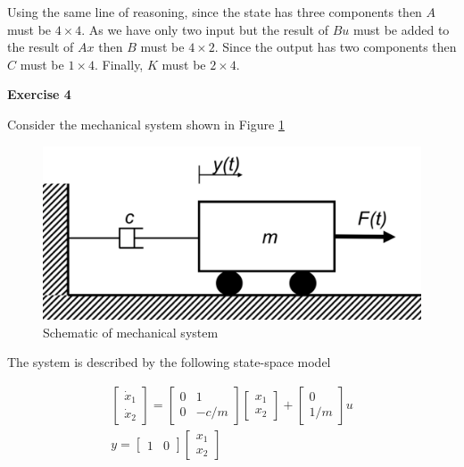Using the same line of reasoning, since the state has three components then $A$ must be $4\times 4$. As we have only two input but the result of $Bu$ must be added to the result of $Ax$ then $B$ must be $4\times 2$. Since the output has two components then $C$ must be $1\times 4$. Finally, $K$ must be $2\times 4$.



\textbf{Exercise 4}

Consider the mechanical system shown in Figure \ref{Mechanical_system_3_1_1_ex_4} 


\begin{figure}[!htb]
\begin{center}
\includegraphics[scale=0.280]{img/state_feedback/Mechanical_system_3_1_1_ex_4.png}
\end{center}
\caption{Schematic of mechanical system}
\label{Mechanical_system_3_1_1_ex_4}
\end{figure}

The system is described by the following state-space model

\begin{eqnarray}
\begin{bmatrix}
 \dot{x}_1 \\
 \dot{x}_2 
\end{bmatrix} =  
\begin{bmatrix}
 0 & 1 \\
 0 & -c/m
\end{bmatrix}
\begin{bmatrix}
 x_1 \\
 x_2  
\end{bmatrix}+
\begin{bmatrix}
 0 \\
 1/m  
\end{bmatrix}u \\
y =
\begin{bmatrix}
 1 & 0 
\end{bmatrix}
\begin{bmatrix}
 x_1 \\
 x_2  
\end{bmatrix}
\end{eqnarray}

